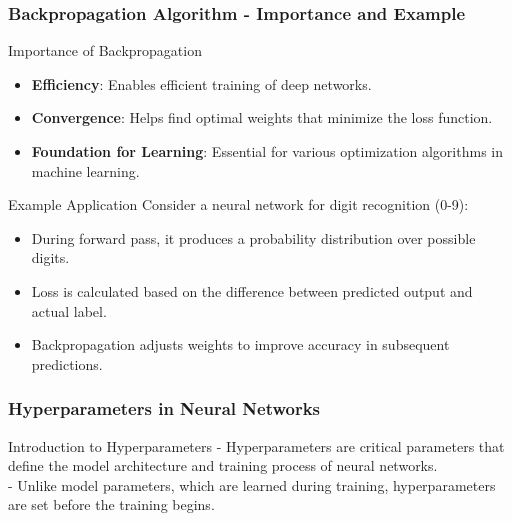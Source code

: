 \documentclass[aspectratio=169]{beamer}
\begin{document}
\begin{frame}[fragile]
    \frametitle{Backpropagation Algorithm - Importance and Example}
    \begin{block}{Importance of Backpropagation}
        \begin{itemize}
            \item \textbf{Efficiency}: Enables efficient training of deep networks.
            \item \textbf{Convergence}: Helps find optimal weights that minimize the loss function.
            \item \textbf{Foundation for Learning}: Essential for various optimization algorithms in machine learning.
        \end{itemize}
    \end{block}

    \begin{block}{Example Application}
        Consider a neural network for digit recognition (0-9):
        \begin{itemize}
            \item During forward pass, it produces a probability distribution over possible digits.
            \item Loss is calculated based on the difference between predicted output and actual label.
            \item Backpropagation adjusts weights to improve accuracy in subsequent predictions.
        \end{itemize}
    \end{block}
\end{frame}

\begin{frame}[fragile]
    \frametitle{Hyperparameters in Neural Networks}
    \begin{block}{Introduction to Hyperparameters}
        - Hyperparameters are critical parameters that define the model architecture and training process of neural networks.\\
        - Unlike model parameters, which are learned during training, hyperparameters are set before the training begins.
    \end{block}
\end{frame}
\end{document}
